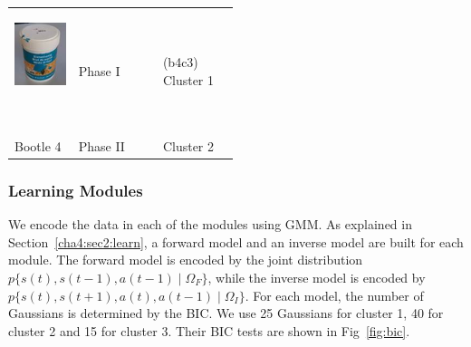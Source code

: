 \begin{table}
\begin{tabular}{p{1.6cm} p{1.6cm}|p{2cm} p{2cm} p{2cm}  p{2cm} }
{\parbox[c]{1em}{\includegraphics[width=1.5cm]{./fig_cha4/b4.jpg}}\newline }
         & Phase I  &           &           &{\vspace{-0.7cm}}\pbox{2cm}{(b4c3) \\Cluster 1} &           \\
Bootle 4 & Phase II &           &           &       Cluster 2 &           \\ \hline
\end{tabular}
\label{tab:cluster}
\end{table}



\subsubsection{Learning Modules}
\label{cha4:sec3:learning:module}
We encode the data in each of the modules using GMM. As explained in Section~\ref{cha4:sec2:learn}, a forward model and an inverse model are built for each module. The forward model is encoded by the joint distribution $p\{s(t),s(t-1),a(t-1)\mid\Omega_F\}$, while the inverse model is encoded by $p\{s(t),s(t+1),a(t),a(t-1)\mid\Omega_I\}$. For each model, the number of Gaussians is determined by the BIC. We use 25 Gaussians for cluster 1, 40 for cluster 2 and 15 for cluster 3. Their BIC tests are shown in Fig~\ref{fig:bic}.

